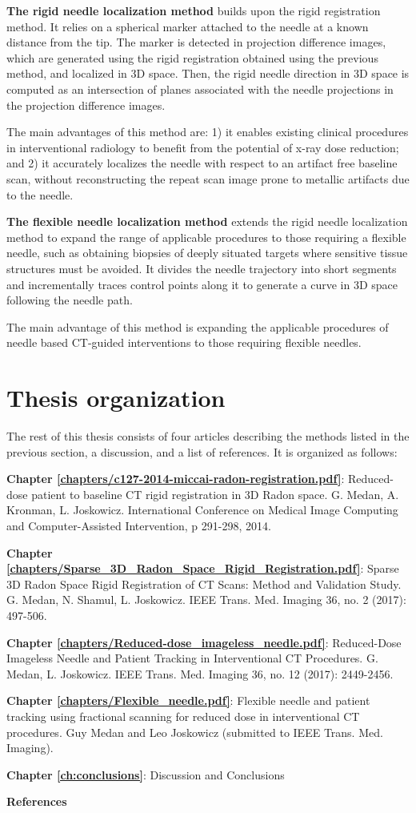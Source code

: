 \textbf{The rigid needle localization method} builds upon the rigid registration method.
It relies on a spherical marker attached to the needle at a known distance from the tip. The marker is detected in projection difference images, which are generated using the rigid registration obtained using the previous method, and localized in 3D space. Then, the rigid needle direction in 3D space is computed as an intersection of planes associated with the needle projections in the projection difference images.

The main advantages of this method are: 1) it enables existing clinical procedures in interventional radiology to benefit from the potential of x-ray dose reduction; and 2) it accurately localizes the needle with respect to an artifact free baseline scan, without reconstructing the repeat scan image prone to metallic artifacts due to the needle.

\textbf{The flexible needle localization method} extends the rigid needle localization method to expand the range of applicable procedures to those requiring a flexible needle, such as obtaining biopsies of deeply situated targets where sensitive tissue structures must be avoided.
It divides the needle trajectory into short segments and incrementally traces control points along it to generate a curve in 3D space following the needle path.

The main advantage of this method is expanding the applicable procedures of needle based CT-guided interventions to those requiring flexible needles.


\section{Thesis organization}

The rest of this thesis consists of four articles describing the methods listed in the previous section, a discussion, and a list of references. It is organized as follows: 

\textbf{Chapter \ref{chapters/c127-2014-miccai-radon-registration.pdf}}: Reduced-dose patient to baseline CT rigid registration in 3D Radon space.
G. Medan, A. Kronman, L. Joskowicz. International Conference on Medical Image Computing and Computer-Assisted Intervention, p 291-298, 2014.

\textbf{Chapter \ref{chapters/Sparse_3D_Radon_Space_Rigid_Registration.pdf}}: Sparse 3D Radon Space Rigid Registration of CT Scans: Method and Validation Study.
G. Medan, N. Shamul, L. Joskowicz. IEEE Trans. Med. Imaging 36, no. 2 (2017): 497-506.

\textbf{Chapter \ref{chapters/Reduced-dose_imageless_needle.pdf}}: Reduced-Dose Imageless Needle and Patient Tracking in Interventional CT Procedures.
G. Medan, L. Joskowicz. IEEE Trans. Med. Imaging 36, no. 12 (2017): 2449-2456.

\textbf{Chapter \ref{chapters/Flexible_needle.pdf}}: Flexible needle and patient tracking using fractional scanning for reduced dose in interventional CT procedures. Guy Medan and Leo Joskowicz (submitted to IEEE Trans. Med. Imaging). %

\textbf{Chapter \ref{ch:conclusions}}: Discussion and Conclusions

\textbf{References}